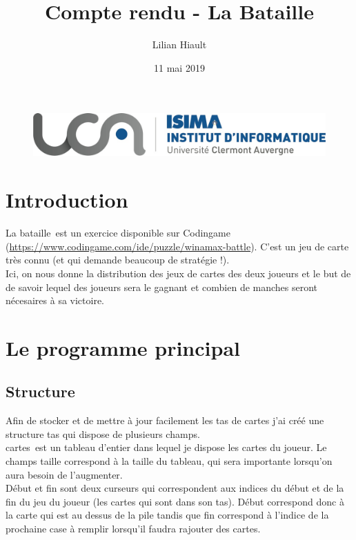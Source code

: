 \documentclass{article}
\title{Compte rendu - La Bataille}
\author{Lilian Hiault}
\date{11 mai 2019}
\begin{document}
\begin{figure}
  \centerline{\includegraphics[scale=0.2]{logo-isima.jpeg}}
\end{figure}

\maketitle

\tableofcontents

\section*{Introduction}

\og La bataille\fg \ est un exercice disponible sur Codingame (\url{https://www.codingame.com/ide/puzzle/winamax-battle}). C'est un jeu de carte très connu (et qui demande beaucoup de stratégie !).
\\ Ici, on nous donne la distribution des jeux de cartes des deux joueurs et le but de de savoir lequel des joueurs sera le gagnant et combien de manches seront nécesaires à sa victoire.

\section{Le programme principal}

\subsection{Structure}

Afin de stocker et de mettre à jour facilement les tas de cartes j'ai créé une structure tas qui dispose de plusieurs champs. \\
\og cartes\fg \ est un tableau d'entier dans lequel je dispose les cartes du joueur. Le champs taille correspond à la taille du tableau, qui sera importante lorsqu'on aura besoin de l'augmenter.\\
Début et fin sont deux curseurs qui correspondent aux indices du début et de la fin du jeu du joueur (les cartes qui sont dans son tas). Début correspond donc à la carte qui est au dessus de la pile tandis que fin correspond à l'indice de la prochaine case à remplir lorsqu'il faudra rajouter des cartes.
\\
\end{document}
